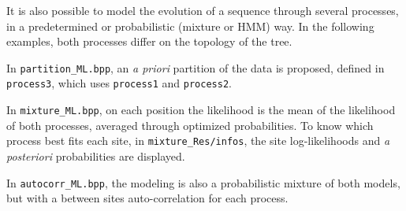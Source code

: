 \documentclass{article}
\begin{document}
It is also possible to model the evolution of a sequence through
several processes, in a predetermined or probabilistic (mixture or
HMM) way. In the following examples, both processes differ on the
topology of the tree.

In \verb#partition_ML.bpp#, an \textit{a priori} partition of the data
is proposed, defined in \verb#process3#, which uses \verb#process1#
and \verb#process2#.

In \verb#mixture_ML.bpp#, on each position the likelihood is the mean
of the likelihood of both processes, averaged through optimized
probabilities. To know which process best fits each site, in
\verb#mixture_Res/infos#, the site log-likelihoods and \textit{a
  posteriori} probabilities are displayed.

In \verb#autocorr_ML.bpp#, the modeling is also a probabilistic
mixture of both models, but with a between sites auto-correlation for
each process.




\end{document}

